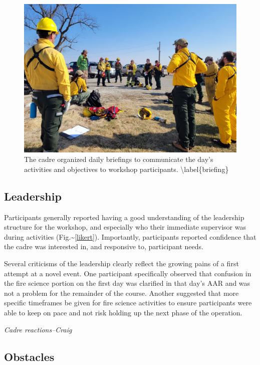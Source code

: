 \documentclass[fire,article,submit,moreauthors,pdftex]{Definitions/mdpi}
\begin{document}
\begin{figure}
\centering
\includegraphics[width=1\columnwidth]{BriefingCircle.jpg}
\caption{The cadre organized daily briefings to communicate the day's activities and objectives to workshop participants. \textbackslash label\{briefing\}}
\end{figure}

\hypertarget{leadership}{%
\subsection{Leadership}\label{leadership}}

Participants generally reported having a good understanding of the leadership structure for the workshop, and especially who their immediate supervisor was during activities (Fig.\textasciitilde{}\ref{likert}).
Importantly, participants reported confidence that the cadre was interested in, and responsive to, participant needs.

Several criticisms of the leadership clearly reflect the growing pains of a first attempt at a novel event.
One participant specifically observed that confusion in the fire science portion on the first day was clarified in that day's AAR and was not a problem for the remainder of the course.
Another suggested that more specific timeframes be given for fire science activities to ensure participants were able to keep on pace and not risk holding up the next phase of the operation.

\emph{Cadre reactions--Craig}

\hypertarget{obstacles}{%
\subsection{Obstacles}\label{obstacles}}
\end{document}
